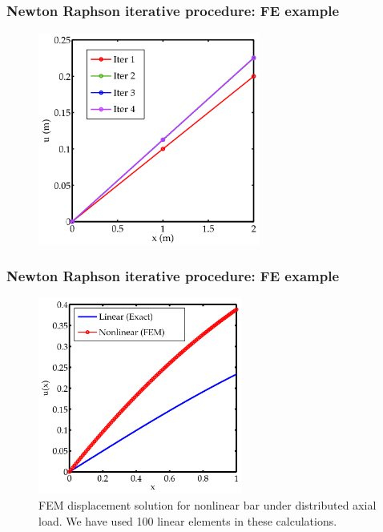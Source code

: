 \documentclass[notes]{beamer}
\begin{document}
\begin{frame}
\frametitle{Newton Raphson iterative procedure: FE example}
\begin{figure}[ht]
	\centering
	\includegraphics[width=0.65\textwidth]{figs/nr-linear.png}
\end{figure}
\end{frame}

\begin{frame}
\frametitle{Newton Raphson iterative procedure: FE example}
\begin{figure}[ht]
\centering
\includegraphics[width=0.6\textwidth]{figs/nr-linear-100.png}
\caption*{FEM displacement solution for nonlinear bar under distributed axial load. We have used 100 linear elements in these calculations.}
\end{figure}
\end{frame}
\end{document}
